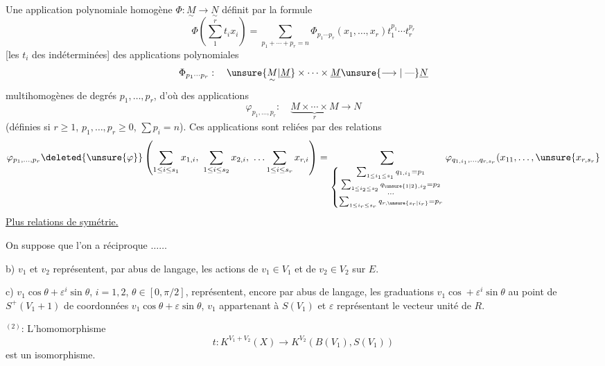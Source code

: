 Une application polynomiale homogène  $\Phi:\underset{\sim}{M}\longrightarrow\underset{\sim}{N}$ définit par la formule
\[
\Phi\left(\sum_1^r t_ix_i\right)=\sum_{p_1+\cdots+p_r=n}\Phi_{p_1\cdots p_r}(x_1,\ldots,x_r)t_1^{p_1}\cdots t_r^{p_r}
\]
[les $t_i$ des indéterminées] des applications polynomiales
\[
\Phi_{p_1\cdots p_r}:\quad\unsure{\underset{\sim}{M}|\underline M}\times\cdots\times\underline M\unsure{\longrightarrow|\mathrel{\text{---}}}\underline N
\]
multihomogènes de degrés $p_1,\ldots,p_r$, d'où des applications
\[
\varphi_{p_1,\ldots,p_r}:\quad\underbrace{M\times\cdots\times M}_{r}\longrightarrow N
\]
(définies si $r\geq1$, $p_1,\ldots,p_r\geq0$, $\sum p_i=n$). Ces applications sont reliées par des relations
\[
\varphi_{p_1,\ldots,p_r}\deleted{\unsure{\varphi}}\left(\sum_{1\leq i\leq s_1}x_{1,i},\ \sum_{1\leq i\leq s_2}x_{2,i},\ \ldots\sum_{1\leq i\leq s_r}x_{r,i}\right)
=\sum_{\left\{\substack{\sum_{1\leq i_1\leq s_1}q_{1,i_1}=p_1\\\sum_{1\leq i_2\leq s_2}q_{\unsure{1|2},i_2}=p_2\\\cdots\\\sum_{1\leq i_r\leq s_r}q_{r,\unsure{s_r|i_r}}=p_r}\right.}
\varphi_{q_{1,i_1},\ldots,q_{r,s_r}}(x_{11},\ldots,\unsure{x_{r,s_r}}
\]
\uline{Plus relations de symétrie.}

On suppose que l'on a  réciproque $\ldots\ldots$


b) $v_1$ et $v_2$ représentent, par abus de langage, les actions de $v_1\in V_1$ et de $v_2\in V_2$ sur $E$.

c) $v_1\cos\theta+\varepsilon^i\sin\theta$, $i=1,2$, $\theta\in[0,\pi/2]$, représentent, encore par abus de langage, les graduations $v_1\cos+\varepsilon^i\sin\theta$ au point de $S^+(V_1+1)$ de coordonnées $v_1\cos\theta+\varepsilon\sin\theta$, $v_1$ appartenant à $S(V_1)$ et $\varepsilon$ représentant le vecteur unité de $R$.

 $^{(2)}$: L'homomorphisme
\[
t:K^{V_1+V_2}(X)\longrightarrow K^{V_2}(B(V_1),S(V_1))
\]
est un isomorphisme.

